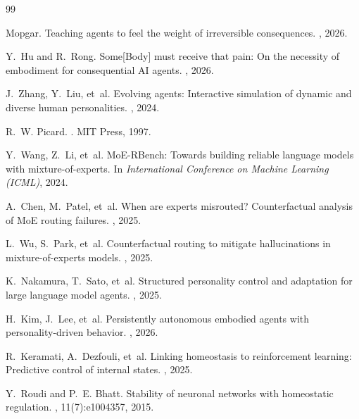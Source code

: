 \documentclass[11pt]{article}
\begin{document}


\begin{thebibliography}{99}

Mopgar.
\newblock Teaching agents to feel the weight of irreversible consequences.
, 2026.

Y.~Hu and R.~Rong.
\newblock Some[Body] must receive that pain: On the necessity of embodiment for consequential AI agents.
, 2026.

J.~Zhang, Y.~Liu, et~al.
\newblock Evolving agents: Interactive simulation of dynamic and diverse human personalities.
, 2024.

R.~W. Picard.
.
\newblock MIT Press, 1997.

Y.~Wang, Z.~Li, et~al.
\newblock MoE-RBench: Towards building reliable language models with mixture-of-experts.
\newblock In {\em International Conference on Machine Learning (ICML)}, 2024.

A.~Chen, M.~Patel, et~al.
\newblock When are experts misrouted? Counterfactual analysis of MoE routing failures.
, 2025.

L.~Wu, S.~Park, et~al.
\newblock Counterfactual routing to mitigate hallucinations in mixture-of-experts models.
, 2025.

K.~Nakamura, T.~Sato, et~al.
\newblock Structured personality control and adaptation for large language model agents.
, 2025.

H.~Kim, J.~Lee, et~al.
\newblock Persistently autonomous embodied agents with personality-driven behavior.
, 2026.

R.~Keramati, A.~Dezfouli, et~al.
\newblock Linking homeostasis to reinforcement learning: Predictive control of internal states.
, 2025.

Y.~Roudi and P.~E. Bhatt.
\newblock Stability of neuronal networks with homeostatic regulation.
, 11(7):e1004357, 2015.


\end{thebibliography}
\end{document}
